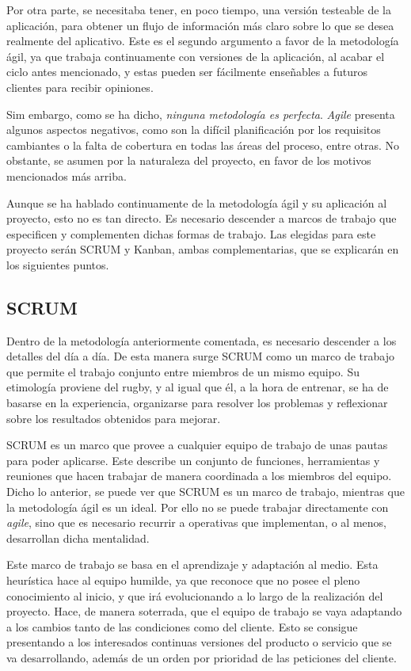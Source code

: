 Por otra parte, se necesitaba tener, en poco tiempo, una versión testeable de la aplicación, para obtener un flujo de información más claro sobre lo que se desea realmente del aplicativo. Este es el segundo argumento a favor de la metodología ágil, ya que trabaja continuamente con versiones de la aplicación, al acabar el ciclo antes mencionado, y estas pueden ser fácilmente enseñables a futuros clientes para recibir opiniones.

Sim embargo, como se ha dicho, \textit{ninguna metodología es perfecta}. \textit{Agile} presenta algunos aspectos negativos, como son la difícil planificación por los requisitos cambiantes o la falta de cobertura en todas las áreas del proceso, entre otras. No obstante, se asumen por la naturaleza del proyecto, en favor de los motivos mencionados más arriba.

Aunque se ha hablado continuamente de la metodología ágil y su aplicación al proyecto, esto no es tan directo. Es necesario descender a marcos de trabajo que especificen y complementen dichas formas de trabajo. Las elegidas para este proyecto serán SCRUM y Kanban, ambas complementarias, que se explicarán en los siguientes puntos.

\subsection{SCRUM}
Dentro de la metodología anteriormente comentada, es necesario descender a los detalles del día a día. De esta manera surge SCRUM como un marco de trabajo que permite el trabajo conjunto entre miembros de un mismo equipo. Su etimología proviene del rugby, y al igual que él, a la hora de entrenar, se ha de basarse en la experiencia, organizarse para resolver los problemas y reflexionar sobre los resultados obtenidos para mejorar.

SCRUM es un marco que provee a cualquier equipo de trabajo de unas pautas para poder aplicarse. Este describe un conjunto de funciones, herramientas y reuniones que hacen trabajar de manera coordinada a los miembros del equipo. Dicho lo anterior, se puede ver que SCRUM es un marco de trabajo, mientras que la metodología ágil es un ideal. Por ello no se puede trabajar directamente con \textit{agile}, sino que es necesario recurrir a operativas que implementan, o al menos, desarrollan dicha mentalidad.

Este marco de trabajo se basa en el aprendizaje y adaptación al medio. Esta heurística hace al equipo humilde, ya que reconoce que no posee el pleno conocimiento al inicio, y que irá evolucionando a lo largo de la realización del proyecto. Hace, de manera soterrada, que el equipo de trabajo se vaya adaptando a los cambios tanto de las condiciones como del cliente. Esto se consigue presentando a los interesados continuas versiones del producto o servicio que se va desarrollando, además de un orden por prioridad de las peticiones del cliente.

